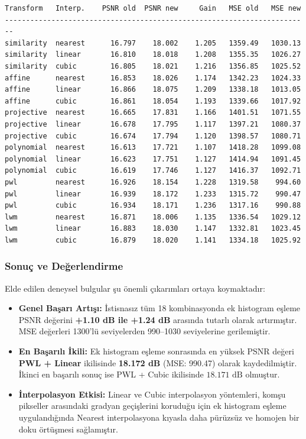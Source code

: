 \documentclass[12pt,a4paper]{article}
\begin{document}
\begin{lstlisting}[caption={18 kombinasyon için ek histogram eşleme sayısal sonuçları terminal çıktısı}, label={lst:hist_match_terminal}]
Transform   Interp.    PSNR old  PSNR new     Gain   MSE old   MSE new
------------------------------------------------------------------------
similarity  nearest      16.797    18.002    1.205   1359.49   1030.13
similarity  linear       16.810    18.018    1.208   1355.35   1026.27
similarity  cubic        16.805    18.021    1.216   1356.85   1025.52
affine      nearest      16.853    18.026    1.174   1342.23   1024.33
affine      linear       16.866    18.075    1.209   1338.18   1013.05
affine      cubic        16.861    18.054    1.193   1339.66   1017.92
projective  nearest      16.665    17.831    1.166   1401.51   1071.55
projective  linear       16.678    17.795    1.117   1397.21   1080.37
projective  cubic        16.674    17.794    1.120   1398.57   1080.71
polynomial  nearest      16.613    17.721    1.107   1418.28   1099.08
polynomial  linear       16.623    17.751    1.127   1414.94   1091.45
polynomial  cubic        16.619    17.746    1.127   1416.37   1092.71
pwl         nearest      16.926    18.154    1.228   1319.58    994.60
pwl         linear       16.939    18.172    1.233   1315.72    990.47
pwl         cubic        16.934    18.171    1.236   1317.16    990.88
lwm         nearest      16.871    18.006    1.135   1336.54   1029.12
lwm         linear       16.883    18.030    1.147   1332.81   1023.45
lwm         cubic        16.879    18.020    1.141   1334.18   1025.92
\end{lstlisting}

\subsubsection{Sonuç ve Değerlendirme}
Elde edilen deneysel bulgular şu önemli çıkarımları ortaya koymaktadır:
\begin{itemize}
    \item \textbf{Genel Başarı Artışı:} İstisnasız tüm 18 kombinasyonda ek histogram eşleme PSNR değerini \textbf{+1.10 dB ile +1.24 dB} arasında tutarlı olarak artırmıştır. MSE değerleri 1300'lü seviyelerden 990--1030 seviyelerine gerilemiştir.
    \item \textbf{En Başarılı İkili:} Ek histogram eşleme sonrasında en yüksek PSNR değeri \textbf{PWL + Linear} ikilisinde \textbf{18.172 dB} (MSE: 990.47) olarak kaydedilmiştir. İkinci en başarılı sonuç ise PWL + Cubic ikilisinde $18.171\text{ dB}$ olmuştur.
    \item \textbf{İnterpolasyon Etkisi:} Linear ve Cubic interpolasyon yöntemleri, komşu pikseller arasındaki gradyan geçişlerini koruduğu için ek histogram eşleme uygulandığında Nearest interpolasyona kıyasla daha pürüzsüz ve homojen bir doku örtüşmesi sağlamıştır.
\end{itemize}
\end{document}
